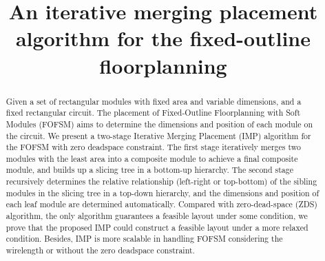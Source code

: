 \documentclass[conference]{IEEEtran}
\begin{document}
\title{An iterative merging placement algorithm for the fixed-outline floorplanning}


\author{
\and
{}
\and
{}
}










\maketitle

\begin{abstract}

Given a set of rectangular modules with fixed area and variable dimensions, and a fixed rectangular circuit. The placement of Fixed-Outline Floorplanning with Soft Modules (FOFSM) aims to determine the dimensions and position of each module on the circuit. We present a two-stage Iterative Merging Placement (IMP) algorithm for the FOFSM with zero deadspace constraint. The first stage iteratively merges two modules with the least area into a composite module to achieve a final composite module, and builds up a slicing tree in a bottom-up hierarchy. The second stage recursively determines the relative relationship (left-right or top-bottom) of the sibling modules in the slicing tree in a top-down hierarchy, and the dimensions and position of each leaf module are determined automatically. Compared with zero-dead-space (ZDS) algorithm, the only algorithm guarantees a feasible layout under some condition, we prove that the proposed IMP could construct a feasible layout under a more relaxed condition. Besides, IMP is more scalable in handling FOFSM considering the wirelength or without the zero deadspace constraint.

\end{abstract}
\end{document}
